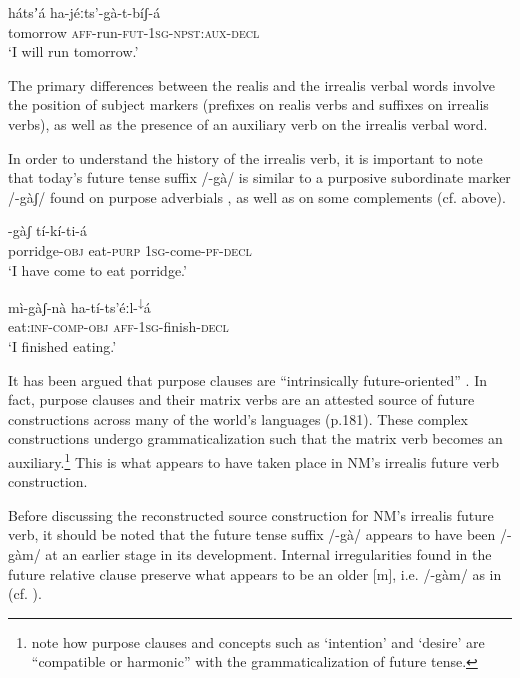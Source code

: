 \documentclass[output=paper]{langsci/langscibook}
\begin{document}
\ea\label{ex:mahland:74}
\gll h\'{a}tsʼ\'{a}    ha-j\'{e}ːts'-g\`{a}-t-b\'{i}ʃ-\'{a}     \\
tomorrow  \textsc{aff}{}-run-\textsc{fut-1sg-npst:aux-decl} \\
\glt `I will run tomorrow.'
\z

The primary differences between the realis and the irrealis verbal words involve the position of subject markers (prefixes on realis verbs and suffixes on irrealis verbs), as well as the presence of an auxiliary verb on the irrealis verbal word. 

In order to understand the history of the irrealis verb, it is important to note that today's future tense suffix /-g\`{a}/ is similar to a purposive subordinate marker /-g\`{a}ʃ/ found on purpose adverbials , as well as on some complements  (cf.  above). 

\ea\label{ex:mahland:75}
\gll [k\`{a}ːl-l\`{a}     m\'{i}]-g\`{a}ʃ  t\'{i}-k\'{i}-ti-\'{a}\\
  porridge-\textsc{obj}    eat-\textsc{purp}  \textsc{1sg}{}-come-\textsc{pf-decl }\\
  \glt `I have come to eat porridge.'
\z

\ea\label{ex:mahland:76}
\gll m\`{i}-g\`{a}ʃ-n\`{a}             ha-t\'{i}-ts'\'{e}ːl-\textsuperscript{↓}\'{a} \\
  eat:\textsc{inf-comp-obj  aff-1sg-}finish-\textsc{decl}   \\
  \glt `I finished eating.'
\z

It has been argued that purpose clauses are “intrinsically future-oriented” \citep[43]{Schmidtke-Bode2009}. In fact, purpose clauses and their matrix verbs are an attested source of future constructions across many of the world's languages (p.181). These complex constructions undergo grammaticalization such that the matrix verb becomes an auxiliary.\footnote{\citet[263-75]{BybeeEtAl1994} note how purpose clauses and concepts such as `intention' and `desire' are “compatible or harmonic” with the grammaticalization of future tense.} This is what appears to have taken place in NM's irrealis future verb construction. 

Before discussing the reconstructed source construction for NM's irrealis future verb, it should be noted that the future tense suffix /-g\`{a}/ appears to have been /-g\`{a}m/ at an earlier stage in its development. Internal irregularities found in the future relative clause preserve what appears to be an older [m], i.e. /-g\`{a}m/ as in  (cf. \citealt[10]{Ahland2014b}).
\end{document}
